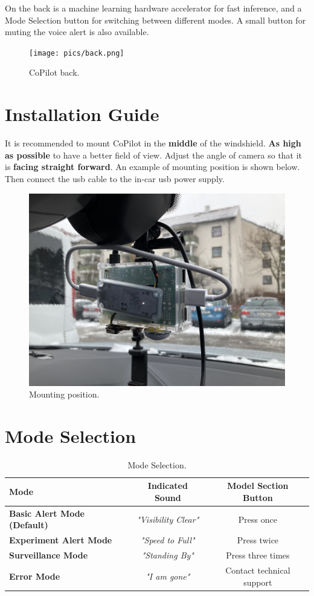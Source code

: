 \documentclass[a4paper]{manual}
\begin{document}
On the back is a machine learning hardware accelerator for fast inference, and a Mode Selection button for switching between different modes. 
A small button for muting the voice alert is also available.
\begin{figure}[h!]
  \centering
  \texttt{[image: pics/back.png]}
  \caption[]{CoPilot back.}
  \label{fig:front}
\end{figure}

\section{Installation Guide}
It is recommended to mount CoPilot in the \textbf{middle} of the windshield. \textbf{As high as possible} to have a better field of view. Adjust the angle of camera so that it is \textbf{facing straight forward}.
An example of mounting position is shown below. Then connect the usb cable to the in-car usb power supply.

\begin{figure}[h!]
  \centering
  \includegraphics[width=.65\textwidth]{pics/interior}
  \caption[]{Mounting position.}
  \label{fig:front}
\end{figure}

\section{Mode Selection}


\begin{table}[h!]
\centering
\caption{\label{tab:mode}Mode Selection.}
\begin{tabular}{l|c|c}
\hline
    Mode & Indicated Sound & Model Section Button\\\hline
    \textbf{Basic Alert Mode (Default)}& \emph{"Visibility Clear"} & Press once \\\hline
    \textbf{Experiment Alert Mode} & \emph{"Speed to Full"} & Press twice \\\hline
    \textbf{Surveillance Mode} & \emph{"Standing By"} & Press three times \\\hline
    \textbf{Error Mode} & \emph{"I am gone"} & Contact technical support \\\hline
\end{tabular}
\end{table}
\end{document}
